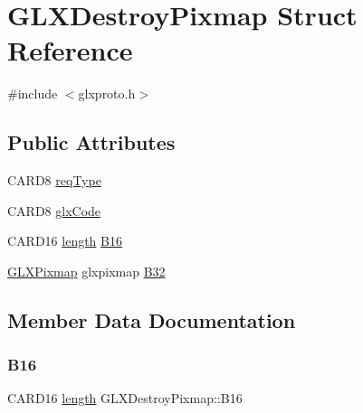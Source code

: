 \hypertarget{struct_g_l_x_destroy_pixmap}{}\section{G\+L\+X\+Destroy\+Pixmap Struct Reference}
\label{struct_g_l_x_destroy_pixmap}


{\ttfamily \#include $<$glxproto.\+h$>$}

\subsection*{Public Attributes}
\begin{DoxyCompactItemize}
\item 
C\+A\+R\+D8 \hyperlink{struct_g_l_x_destroy_pixmap_a761991ed44aee6079ede39f1c2a50f33}{req\+Type}
\item 
C\+A\+R\+D8 \hyperlink{struct_g_l_x_destroy_pixmap_a87c2f45267bd1808cc1b6c27699a3b64}{glx\+Code}
\item 
C\+A\+R\+D16 \hyperlink{glcorearb_8h_ab9c919755bde3b34349e23a32b4e0fa7}{length} \hyperlink{struct_g_l_x_destroy_pixmap_a9fe189f2b29da8fb9d05786cfdc71066}{B16}
\item 
\hyperlink{glx_8h_a6577d581069de43ebaac50c78dbccbd0}{G\+L\+X\+Pixmap} glxpixmap \hyperlink{struct_g_l_x_destroy_pixmap_a066324eb4e1e90c772440b14cd1dfafe}{B32}
\end{DoxyCompactItemize}


\subsection{Member Data Documentation}
\mbox{\label{struct_g_l_x_destroy_pixmap_a9fe189f2b29da8fb9d05786cfdc71066}} 
\subsubsection{\texorpdfstring{B16}{B16}}
{\footnotesize\ttfamily C\+A\+R\+D16 \hyperlink{glcorearb_8h_ab9c919755bde3b34349e23a32b4e0fa7}{length} G\+L\+X\+Destroy\+Pixmap\+::\+B16}

\mbox{\label{struct_g_l_x_destroy_pixmap_a066324eb4e1e90c772440b14cd1dfafe}} 
